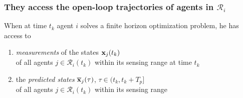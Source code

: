 \begin{frame} %
  \frametitle{They access the open-loop trajectories of agents in $\mathcal{R}_i$}

When at time $t_k$ agent $i$ solves a finite horizon optimization problem,
he has access to\\[3ex]



\begin{enumerate}
  \item \textit{measurements} of the states $\bm{\mathbf{x}}_j(t_k)$\\[2ex]
    of all agents $j \in \mathcal{R}_i(t_k)$ within its sensing range at time $t_k$\\[4ex]

    \item the \textit{predicted states} $\overline{\bm{\mathbf{x}}}_j(\tau)$, $\tau \in (t_k, t_k + T_p]$\\[2ex]
      of all agents $j \in \mathcal{R}_i(t_k)$ within its sensing range\\
  \end{enumerate}

\end{frame} %
